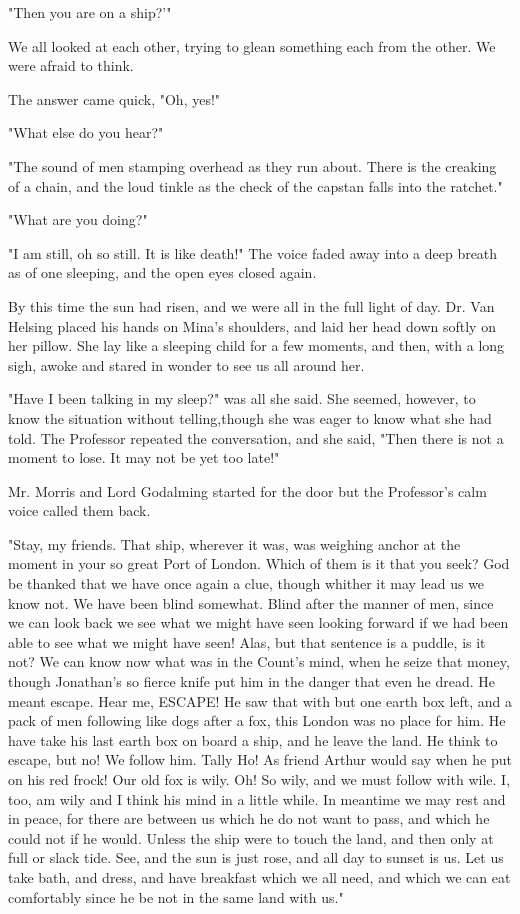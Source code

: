 "Then you are on a ship?'" 

We all looked at each other, trying to glean something each from the other. We were afraid to think. 

The answer came quick, "Oh, yes!" 

"What else do you hear?" 

"The sound of men stamping overhead as they run about. There is the creaking of a chain, and the loud tinkle as the check of the capstan falls into the ratchet." 

"What are you doing?" 

"I am still, oh so still. It is like death!" The voice faded away into a deep breath as of one sleeping, and the open eyes closed again. 

By this time the sun had risen, and we were all in the full light of day. Dr. Van Helsing placed his hands on Mina's shoulders, and laid her head down softly on her pillow. She lay like a sleeping child for a few moments, and then, with a long sigh, awoke and stared in wonder to see us all around her. 

"Have I been talking in my sleep?" was all she said. She seemed, however, to know the situation without telling,though she was eager to know what she had told. The Professor repeated the conversation, and she said, "Then there is not a moment to lose. It may not be yet too late!" 

Mr. Morris and Lord Godalming started for the door but the Professor's calm voice called them back. 

"Stay, my friends. That ship, wherever it was, was weighing anchor at the moment in your so great Port of London. Which of them is it that you seek? God be thanked that we have once again a clue, though whither it may lead us we know not. We have been blind somewhat. Blind after the manner of men, since we can look back we see what we might have seen looking forward if we had been able to see what we might have seen! Alas, but that sentence is a puddle, is it not? We can know now what was in the Count's mind, when he seize that money, though Jonathan's so fierce knife put him in the danger that even he dread. He meant escape. Hear me, ESCAPE! He saw that with but one earth box left, and a pack of men following like dogs after a fox, this London was no place for him. He have take his last earth box on board a ship, and he leave the land. He think to escape, but no! We follow him. Tally Ho! As friend Arthur would say when he put on his red frock! Our old fox is wily. Oh! So wily, and we must follow with wile. I, too, am wily and I think his mind in a little while. In meantime we may rest and in peace, for there are between us which he do not want to pass, and which he could not if he would. Unless the ship were to touch the land, and then only at full or slack tide. See, and the sun is just rose, and all day to sunset is us. Let us take bath, and dress, and have breakfast which we all need, and which we can eat comfortably since he be not in the same land with us." 

